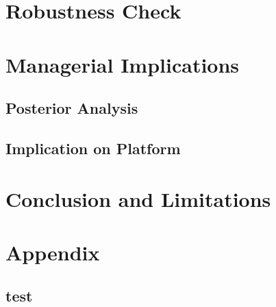 \documentclass[a4paper, 12pt]{article}
\begin{document}
\section{Robustness Check}
\section{Managerial Implications}
\subsection{Posterior Analysis}
\subsection{Implication on Platform}
\section{Conclusion and Limitations}


\clearpage
\setcounter{section}{0}
\setcounter{subsection}{0}
\setcounter{equation}{0}
\setcounter{table}{0}
\setcounter{figure}{0}
\renewcommand{\thesection}{\Alph{section}}
\renewcommand{\theequation}{\thesection.\arabic{equation}}
\renewcommand{\thesubsection}{\thesection.\arabic{subsection}}
\renewcommand{\thetable}{\thesection.\arabic{table}}
\renewcommand{\thefigure}{\thesection.\arabic{figure}}
\section{Appendix} \label{sec:app}
\subsection{test}


\clearpage
\printbibliography
\end{document}
